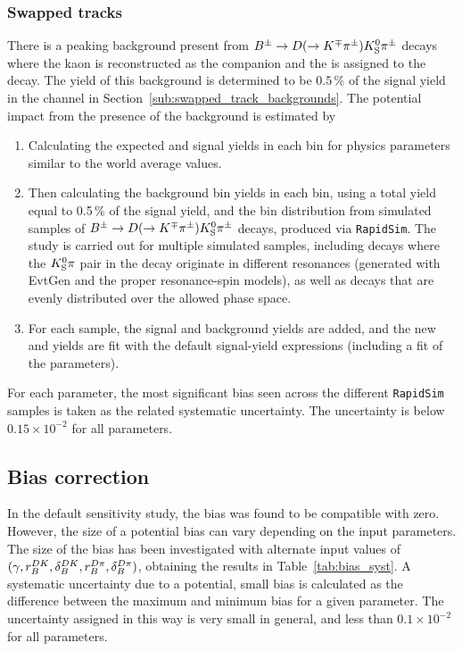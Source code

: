 \subsubsection{Swapped tracks} %
\label{ssub:swapped_tracks_systematic}

There is a peaking background present from ${{{B}^\pm}\rightarrow {\ensuremath{D}}(\rightarrow {\ensuremath{{K}^\mp}}{\ensuremath{{\pi}^\pm}}){{K}^0_{\mathrm{S}}}{{\pi}^\pm}}$ decays where the kaon is reconstructed as the companion and the \KS is assigned to the \D decay. The yield of this background is determined to be $0.5\,\%$ of the signal yield in the \BtoDK channel in Section~\ref{sub:swapped_track_backgrounds}. The potential impact from the presence of the background is estimated by 
\begin{enumerate}
    \item Calculating the expected \BtoDpi and \BtoDK signal yields in each bin for physics parameters similar to the world average values.
    \item Then calculating the background bin yields in each \BtoDK bin, using a total yield equal to 0.5\,\% of the signal yield, and the bin distribution from simulated samples of ${{B}^\pm}\rightarrow {\ensuremath{D}}(\rightarrow {\ensuremath{{K}^\mp}}{\ensuremath{{\pi}^\pm}}){{K}^0_{\mathrm{S}}}{{\pi}^\pm}$ decays, produced via \texttt{RapidSim}. The study is carried out for multiple simulated samples, including decays where the ${{K}^0_{\mathrm{S}}}\pi$ pair in the \B decay originate in different \Kstar resonances (generated with EvtGen and the proper resonance-spin models), as well as \B decays that are evenly distributed over the allowed phase space.
    \item For each sample, the signal and background yields are added,  and the new \BtoDpi and \BtoDK yields are fit with the default signal-yield expressions (including a fit of the \Fi parameters).
\end{enumerate}
For each parameter, the most significant bias seen across the different \texttt{RapidSim} samples is taken as the related systematic uncertainty. The uncertainty is below $0.15\times 10^{-2}$ for all parameters.




\subsection{Bias correction} %
\label{sub:bias_correction_syst}{}
In the default sensitivity study, the bias was found to be compatible with zero.  However, the size of a potential bias can vary depending on the input parameters. The size of the bias has been investigated with alternate input values of $(\gamma, r_B^{DK}, \delta_B^{DK}, r_B^{{D}\pi}, \delta_B^{{D}\pi})$, obtaining the results in Table~\ref{tab:bias_syst}. A systematic uncertainty due to a potential, small bias is calculated as the difference between the maximum and minimum bias for a given parameter. The uncertainty assigned in this way is very small in general, and less than $0.1\times 10^{-2}$ for all parameters.

